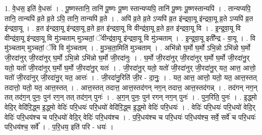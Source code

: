 \documentclass[17pt]{extarticle}
\begin{document}
1. वे॒धस॒ इति॑ वे॒धसः॑ । . पू॒ष्णस्तानि॒ तानि॑ पू॒ष्णः पू॒ष्ण स्तान्यप्यपि॒ तानि॑ पू॒ष्णः पू॒ष्णस्तान्यपि॑ । . तान्यप्यपि॒ तानि॒ तान्यपि॑ व्र॒ते व्र॒ते ऽपि॒ तानि॒ तान्यपि॑ व्र॒ते । . अपि॑ व्र॒ते व्र॒ते ऽप्यपि॑ व्र॒त इ॑न्द्रवा॒यू इ॑न्द्रवा॒यू व्र॒ते ऽप्यपि॑ व्र॒त इ॑न्द्रवा॒यू । . व्र॒त इ॑न्द्रवा॒यू इ॑न्द्रवा॒यू व्र॒ते व्र॒त इ॑न्द्रवा॒यू वि वीन्द्र॑वा॒यू व्र॒ते व्र॒त इ॑न्द्रवा॒यू वि । . इ॒न्द्र॒वा॒यू वि वीन्द्र॑वा॒यू इ॑न्द्रवा॒यू वि मु॑ञ्चताम् मुञ्चतां॒ ॅवीन्द्र॑वा॒यू इ॑न्द्रवा॒यू वि मु॑ञ्चताम् । . इ॒न्द्र॒वा॒यू इती᳚न्द्र - वा॒यू । . वि मु॑ञ्चताम् मुञ्चतां॒ ॅवि वि मु॑ञ्चताम् । . मु॒ञ्च॒ता॒मिति॑ मुञ्चताम् । . अभि॑न्नो घ॒र्मो घ॒र्मो ऽभि॒न्नो ऽभि॑न्नो घ॒र्मो जी॒रदा॑नुर् जी॒रदा॑नुर् घ॒र्मो ऽभि॒न्नो ऽभि॑न्नो घ॒र्मो जी॒रदा॑नुः । . घ॒र्मो जी॒रदा॑नुर् जी॒रदा॑नुर् घ॒र्मो घ॒र्मो जी॒रदा॑नु॒र् यतो॒ यतो॑ जी॒रदा॑नुर् घ॒र्मो घ॒र्मो जी॒रदा॑नु॒र् यतः॑ । . जी॒रदा॑नु॒र् यतो॒ यतो॑ जी॒रदा॑नुर् जी॒रदा॑नु॒र् यत॒ आत्त॒ आत्तो॒ यतो॑ जी॒रदा॑नुर् जी॒रदा॑नु॒र् यत॒ आत्तः॑ । . जी॒रदा॑नु॒रिति॑ जी॒र - दा॒नुः॒ । . यत॒ आत्त॒ आत्तो॒ यतो॒ यत॒ आत्त॒स्तत् तदात्तो॒ यतो॒ यत॒ आत्त॒स्तत् । . आत्त॒स्तत् तदात्त॒ आत्त॒स्तद॑गन् नग॒न् तदात्त॒ आत्त॒स्तद॑गन्न् । . तद॑गन् नग॒न् तत् तद॑ग॒न् पुनः॒ पुन॑ रग॒न् तत् तद॑ग॒न् पुनः॑ । . अ॒ग॒न् पुनः॒ पुन॑ रगन् नग॒न् पुनः॑ । . पुन॒रिति॒ पुनः॑ । . इ॒द्ध्मो वेदि॒र् वेदि॑रि॒द्ध्म इ॒द्ध्मो वेदिः॑ परि॒धयः॑ परि॒धयो॑ वेदि॑रि॒द्ध्म इ॒द्ध्मो वेदिः॑ परि॒धयः॑ । . वेदिः॑ परि॒धयः॑ परि॒धयो॑ वेदि॒र् वेदिः॑ परि॒धय॑श्च च परि॒धयो॑ वेदि॒र् वेदिः॑ परि॒धय॑श्च । . प॒रि॒धय॑श्च च परि॒धयः॑ परि॒धय॑श्च॒ सर्वे॒ सर्वे॑ च परि॒धयः॑ परि॒धय॑श्च॒ सर्वे᳚ । . प॒रि॒धय॒ इति॑ परि - धयः॑ । \newline
\end{document}
